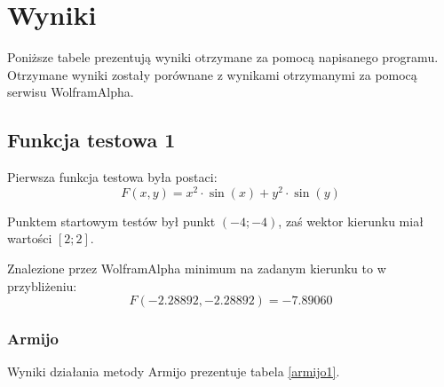 \documentclass{classrep}
\begin{document}
\section{Wyniki}
Poniższe tabele prezentują wyniki otrzymane za pomocą napisanego programu. Otrzymane wyniki zostały porównane z wynikami otrzymanymi za pomocą serwisu WolframAlpha.

\subsection{Funkcja testowa 1}
Pierwsza funkcja testowa była postaci:
\begin{equation}
 F(x, y) = x^2 \cdot \sin(x) + y^2 \cdot \sin(y)
\end{equation}

Punktem startowym testów był punkt $(-4; -4)$, zaś wektor kierunku miał wartości $[2; 2]$.


Znalezione przez WolframAlpha minimum na zadanym kierunku to w przybliżeniu:
\begin{equation}
 F(-2.28892, -2.28892) = -7.89060
\end{equation}


\subsubsection{Armijo}

Wyniki działania metody Armijo prezentuje tabela \ref{armijo1}.
\end{document}
